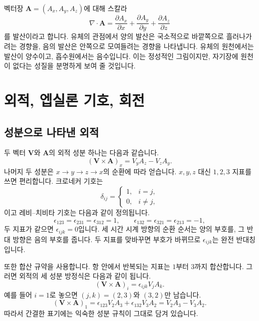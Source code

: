 벡터장 \(\mathbf A=(A_x,A_y,A_z)\)에 대해 스칼라
\begin{equation}
  \nabla\cdot\mathbf A
  =
  \frac{\partial A_x}{\partial x}
  +\frac{\partial A_y}{\partial y}
  +\frac{\partial A_z}{\partial z}
\end{equation}
를 발산이라고 합니다. 유체의 관점에서 양의 발산은 국소적으로 바깥쪽으로 흘러나가려는 경향을, 음의 발산은 안쪽으로 모여들려는 경향을 나타냅니다. 유체의 원천에서는 발산이 양수이고, 흡수원에서는 음수입니다. 이는 정성적인 그림이지만, 자기장에 원천이 없다는 성질을 분명하게 보여 줄 것입니다.

\section{외적, 엡실론 기호, 회전}

\subsection{성분으로 나타낸 외적}

두 벡터 \(\mathbf V\)와 \(\mathbf A\)의 외적 성분 하나는 다음과 같습니다.
\begin{equation}
  (\mathbf V\times\mathbf A)_x
  =
  V_yA_z-V_zA_y.
\end{equation}
나머지 두 성분은 \(x\to y\to z\to x\)의 순환에 따라 얻습니다. \(x,y,z\) 대신 \(1,2,3\) 지표를 쓰면 편리합니다. 크로네커 기호는
\begin{equation}
  \delta_{ij}
  =
  \begin{cases}
    1,&i=j,\\
    0,&i\ne j,
  \end{cases}
\end{equation}
이고 레비--치비타 기호는 다음과 같이 정의됩니다.
\begin{equation}
  \epsilon_{123}=\epsilon_{231}=\epsilon_{312}=1,
  \qquad
  \epsilon_{132}=\epsilon_{321}=\epsilon_{213}=-1,
\end{equation}
두 지표가 같으면 \(\epsilon_{ijk}=0\)입니다. 세 시간 시계 방향의 순환 순서는 양의 부호를, 그 반대 방향은 음의 부호를 줍니다. 두 지표를 맞바꾸면 부호가 바뀌므로 \(\epsilon_{ijk}\)는 완전 반대칭입니다.

또한 합산 규약을 사용합니다. 항 안에서 반복되는 지표는 \(1\)부터 \(3\)까지 합산합니다. 그러면 외적의 세 성분 방정식은 다음과 같이 됩니다.
\begin{equation}
  (\mathbf V\times\mathbf A)_i
  =
  \epsilon_{ijk}V_jA_k.
\end{equation}
예를 들어 \(i=1\)로 놓으면 \((j,k)=(2,3)\)와 \((3,2)\)만 남습니다.
\begin{equation}
  (\mathbf V\times\mathbf A)_1
  =
  \epsilon_{123}V_2A_3
  +\epsilon_{132}V_3A_2
  =
  V_2A_3-V_3A_2.
\end{equation}
따라서 간결한 표기에는 익숙한 성분 규칙이 그대로 담겨 있습니다.

